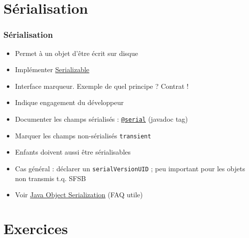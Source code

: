 \documentclass[english, french]{beamer}
\begin{document}
\section{Sérialisation}
\begin{frame}
	\frametitle{Sérialisation}
	\begin{itemize}
		\item Permet à un objet d’être écrit sur disque
		\item Implémenter \href{http://docs.oracle.com/javase/8/docs/api/java/io/Serializable.html}{Serializable}
		\item Interface marqueur. Exemple de quel principe ? \pause Contrat !
		\item Indique engagement du développeur \pause
		\item Documenter les champs sérialisés : \href{http://docs.oracle.com/javase/1.5.0/docs/tooldocs/windows/javadoc.html@serial}{\texttt{@serial}} (javadoc tag)
		\item Marquer les champs non-sérialisés \texttt{transient}
		\item Enfants doivent aussi être sérialisables
		\item {\tiny Cas général : déclarer un \texttt{serialVersionUID} ; peu important pour les objets non transmis t.q. SFSB}
		\item Voir \href{https://docs.oracle.com/javase/8/docs/technotes/guides/serialization/index.html}{Java Object Serialization} (FAQ utile)
	\end{itemize}
\end{frame}

\section{Exercices}
\end{document}
